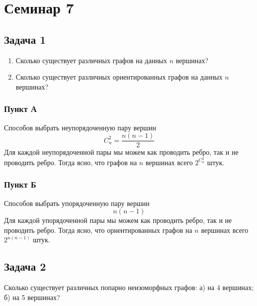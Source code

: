 
\section{Семинар 7}

\subsection{Задача 1}

\begin{enumerate}[label=\asbuk*)]

\item Сколько существует различных графов на данных $n$ вершинах?

\item Сколько существует различных ориентированных графов на данных $n$ вершинах?
\end{enumerate}

\subsubsection{Пункт А}
\begin{solution*}
Способов выбрать неупорядоченную пару вершин
\[
C^2_n = \frac{n(n-1)}{2}
\]
Для каждой неупорядоченной пары мы можем как проводить ребро, так и не проводить ребро. Тогда ясно, что графов на $n$ вершинах всего $2^{C^2_n}$ штук.
\end{solution*}

\subsubsection{Пункт Б}
\begin{solution*}
Способов выбрать упорядоченную пару вершин
\[
n(n-1)
\]
Для каждой упорядоченной пары мы можем как проводить ребро, так и не проводить ребро. Тогда ясно, что ориентированных графов на $n$ вершинах всего $ 2^{n(n-1)}$ штук.
\end{solution*}

\subsection{Задача 2}
Сколько существует различных попарно неизоморфных графов: а) на 4 вершинах; б)
на 5 вершинах?

